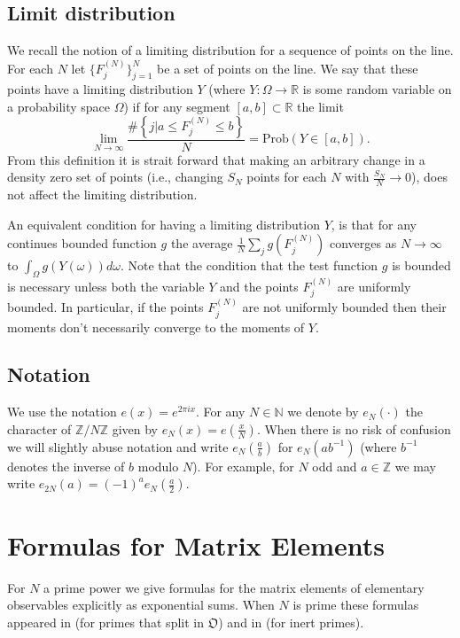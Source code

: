 \documentclass[12pt]{amsart}
\theoremstyle{definition}
\theoremstyle{remark}
\numberwithin{equation}{section}
\newcommand{\set}[1]{\left\{#1\right\}}
\newcommand{\frakO}{\mathfrak{O}}
\newcommand{\bbZ}{\mathbb{Z}}
\newcommand{\bbR}{\mathbb R}
\newcommand{\bbN}{\mathbb N}
\newcommand{\Prob}{\mathrm{Prob}}
\begin{document}
\subsection{Limit distribution}\label{ss:equi}
    We recall the notion of a limiting distribution for a sequence of points on the line.
    For each $N$ let $\{F_j^{(N)}\}_{j=1}^N$ be a set of points on the line. We say
    that these points have a limiting distribution $Y$ (where $Y:\Omega\to\bbR $ is some
    random variable on a probability space $\Omega$) if for any segment $[a,b]\subset\bbR$ the limit
    \[\lim_{N\to\infty}\frac{\#\set{j|a\leq F_j^{(N)}\leq
    b}}{N}=\Prob(Y\in[a,b]).\]
    From this definition it is strait forward that making an arbitrary change
    in a density zero set of points
    (i.e., changing $S_N$ points for each $N$ with
    $\frac{S_N}{N}\to 0$),
    does not affect the limiting distribution.

    An equivalent condition for having a limiting distribution $Y$,
    is that for any continues bounded
    function $g$ the average $\frac{1}{N}\sum_j g(F_j^{(N)})$
    converges as $N\to\infty$ to $\int_\Omega g(Y(\omega))d\omega$.
    Note that the condition that the test function $g$ is
    bounded is necessary unless both the variable $Y$ and the points $F_j^{(N)}$
    are uniformly bounded. In particular, if the points $F_j^{(N)}$
    are not uniformly bounded then their moments don't necessarily converge to the
    moments of $Y$.

\subsection{Notation}
We use the notation $e(x)=e^{2\pi i x}$. For any $N\in\bbN$ we
denote by $e_N(\cdot)$ the character of $\bbZ/N\bbZ$ given by
$e_N(x)=e(\frac{x}{N})$. When there is no risk of confusion we will
slightly abuse notation and write $e_N(\frac{a}{b})$ for
$e_N(ab^{-1})$ (where $b^{-1}$ denotes the inverse of $b$ modulo
$N$). For example, for $N$ odd and $a\in\bbZ$ we may write
$e_{2N}(a)=(-1)^ae_N(\frac{a}{2})$.


\section{Formulas for Matrix Elements}\label{s:form}
For $N$ a prime power we give formulas for the matrix elements of
elementary observables explicitly as exponential sums. When $N$ is
prime these formulas appeared in \cite{KurRud05} (for primes that
split in $\frakO$) and in \cite{Kelmer05Arith} (for inert primes).
\end{document}
